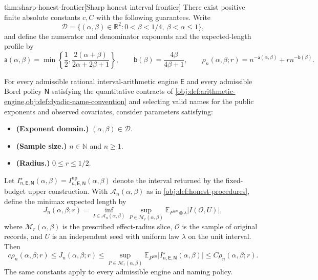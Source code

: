 \documentclass[11pt]{article}
\begin{document}
\begin{theoremv}{thm:sharp-honest-frontier}[Sharp honest interval frontier]
There exist positive finite absolute constants \(c,C\) with the following guarantees. Write
\[
\mathcal D=\{(\alpha,\beta)\in\mathbb R^2:0<\beta<1/4,\ \beta<\alpha\le1\},
\]
and define the numerator and denominator exponents and the expected-length profile by
\[
\mathsf a(\alpha,\beta)
=\min\left\{\frac12,\frac{2(\alpha+\beta)}{2\alpha+2\beta+1}\right\},
\qquad
\mathsf b(\beta)=\frac{4\beta}{4\beta+1},
\qquad
\rho_n(\alpha,\beta;r)
=n^{-\mathsf a(\alpha,\beta)}+r n^{-\mathsf b(\beta)}.
\]

For every admissible rational interval-arithmetic engine \(\mathsf E\) and every admissible Borel policy \(\mathsf N\) satisfying the quantitative contracts of \cref{obj:def:arithmetic-engine,obj:def:dyadic-name-convention} and selecting valid names for the public exponents and observed covariates, consider parameters satisfying:
\begin{itemize}
\item \textbf{(Exponent domain.)} \((\alpha,\beta)\in\mathcal D\).
\item \textbf{(Sample size.)} \(n\in\mathbb N\) and \(n\ge1\).
\item \textbf{(Radius.)} \(0\le r\le1/2\).
\end{itemize}
Let \(I^\star_{n,\mathsf E,\mathsf N}(\alpha,\beta)
=I^{\mathrm{up}}_{n,\mathsf E,\mathsf N}(\alpha,\beta)\) denote the interval returned by the fixed-budget upper construction. With \(\mathcal A_n(\alpha,\beta)\) as in \cref{obj:def:honest-procedures}, define the minimax expected length by
\[
J_n(\alpha,\beta;r)
=
\inf_{I\in\mathcal A_n(\alpha,\beta)}
\sup_{P\in\mathcal M_r(\alpha,\beta)}
\mathbb E_{P^{\otimes n}\otimes\lambda}
\bigl|I(\mathcal O,U)\bigr|,
\]
where \(\mathcal M_r(\alpha,\beta)\) is the prescribed effect-radius slice, \(\mathcal O\) is the sample of original records, and \(U\) is an independent seed with uniform law \(\lambda\) on the unit interval. Then
\[
c\rho_n(\alpha,\beta;r)
\le J_n(\alpha,\beta;r)
\le
\sup_{P\in\mathcal M_r(\alpha,\beta)}
\mathbb E_{P^{\otimes n}}
\bigl|I^\star_{n,\mathsf E,\mathsf N}(\alpha,\beta)\bigr|
\le C\rho_n(\alpha,\beta;r).
\]
The same constants apply to every admissible engine and naming policy.


\end{theoremv}
\end{document}
